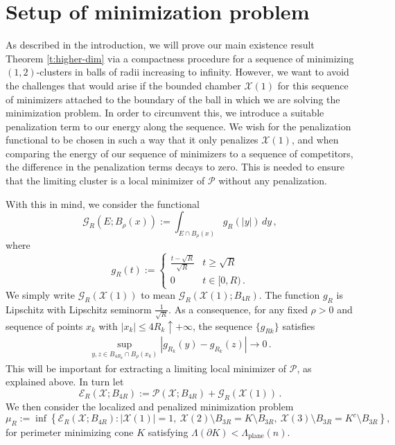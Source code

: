 \documentclass[10pt,reqno]{amsart}
\numberwithin{equation}{section}
\theoremstyle{definition}
\newcommand{\Ecal}{\mathcal{E}}
\newcommand{\Pcal}{\mathcal{P}}
\newcommand{\cG}{\mathcal{G}}
\DeclareMathOperator{\plane}{plane}
\newcommand{\X}{\mathcal{X}}
\begin{document}
\section{Setup of minimization problem}\label{s:setup}
As described in the introduction, we will prove our main existence result Theorem \ref{t:higher-dim} via a compactness procedure for a sequence of minimizing $(1,2)$-clusters in balls of radii increasing to infinity. However, {we want to} avoid the challenges that would arise if  the bounded chamber $\X(1)$ for this sequence of minimizers attached to the boundary of the ball in which we are solving the minimization problem.  In order to circumvent this, we introduce a suitable penalization term to our energy along the sequence. We wish for the penalization functional to be chosen in such a way that it only penalizes $\X(1)$, and when comparing the energy of our sequence of minimizers to a sequence of competitors, the difference in the penalization terms decays to zero. This is needed to ensure that the limiting cluster is a local minimizer of $\Pcal$ without any penalization. 

With this in mind, we consider the functional
\[
    \cG_R(E;B_\rho(x)) := \int_{E \cap B_\rho(x)} g_R(|y|) \, dy\,,
\]
where
\begin{equation}\label{eq:gR def}
    g_R(t) := \begin{cases}
        \frac{t- {\sqrt{R}}}{\sqrt{R}} & t \geq {\sqrt{R}} \\
        0 & t \in [0, R)\,.
    \end{cases}
\end{equation}
We simply write $\cG_R(\X(1))$ to mean $\cG_R(\X(1); B_{4R}).$
The function $g_R$ is Lipschitz with Lipschitz seminorm $\tfrac{1}{\sqrt{R}}$. As a consequence, for any fixed $\rho>0$ and sequence of points $x_{k}$ with $|x_k| \leq 4R_k \uparrow +\infty$, the sequence $\{g_{R{k}}\}$
satisfies 
\begin{align}\label{eq:cons of lip vanishing}
   \sup_{y,z\in B_{4R_k}\cap B_\rho(x_k)}|g_{R_k}(y) - g_{R_k}(z) |\to 0\,. 
\end{align}
{This will be important for extracting a limiting local minimizer of $\Pcal$, as explained above.}
In turn let
\[
    \Ecal_R(\X; B_{4R}) := \Pcal(\X; B_{4R}) + {\cG_R(\X(1))}\,.
\]
We then consider the localized and penalized minimization problem
\begin{equation}\label{e:localized-min-problem}
     \mu_R := \inf \left\{\Ecal_R(\X; B_{4R}) : |\X(1)|=1, \ \X(2)\setminus B_{3R} = K\setminus B_{3R}, \ \X(3)\setminus B_{3R} = K^c\setminus B_{3R} \right\},
\end{equation}
for perimeter minimizing cone $K$ satisfying $\Lambda(\partial K) < \Lambda_{\plane}(n)$.
    
\end{document}
